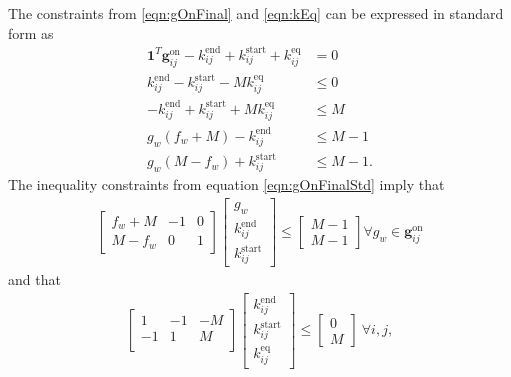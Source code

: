 The constraints from \eqref{eqn:gOnFinal} and \eqref{eqn:kEq} can be expressed in standard form as 
\begin{equation} \label{eqn:gOnFinalStd}\begin{aligned}
	\mathbf{1}^T\mathbf{g}_{ij}^{\text{on}} - k_{ij}^{\text{end}} + k_{ij}^{\text{start}} + k_{ij}^{\text{eq}} &=  0 \\
	k_{ij}^{\text{end}} - k_{ij}^{\text{start}} - M k_{ij}^{\text{eq}} &\le 0 \\
	-k_{ij}^{\text{end}} + k_{ij}^{\text{start}} + M k_{ij}^{\text{eq}} &\le M \\
	g_w\left (f_w + M \right) - k_{ij}^{\text{end}} &\le M - 1 \\
	g_w\left (M - f_w\right) + k_{ij}^{\text{start}} &\le M - 1.
\end{aligned}\end{equation}
The inequality constraints from equation \eqref{eqn:gOnFinalStd} imply that
\begin{equation} \label{eqn:gOnFinalPart1}\begin{aligned}
	\begin{bmatrix}f_w + M & -1 & 0\\
		       M - f_w & 0 & 1 
	\end{bmatrix} 
	\begin{bmatrix}g_w                 \\
		       k_{ij}^{\text{end}} \\ 
		       k_{ij}^{\text{start}}
	\end{bmatrix} \le
	\begin{bmatrix} M - 1 \\
	                M - 1 
	\end{bmatrix} \forall g_w \in \mathbf{g}_{ij}^{\text{on}}
\end{aligned}\end{equation} 
and that
\begin{equation} \label{eqn:kEqStd}\begin{aligned}
	\begin{bmatrix}1 & -1 & -M \\
		       -1 & 1 & M  \\
		       \end{bmatrix} \begin{bmatrix}k_{ij}^{\text{end}} \\ k_{ij}^{\text{start}} \\ k_{ij}^{\text{eq}} \end{bmatrix} \le \begin{bmatrix} 0 \\ M\end{bmatrix} \ \forall i,j,
\end{aligned} \end{equation}
